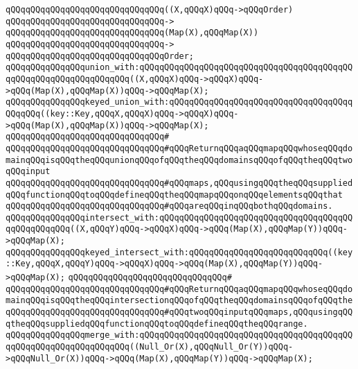 \verb|qQQqqQQqqQQqqQQqqQQqqQQqqQQqqQQq((X,qQQqX)qQQq->qQQqOrder)|\newline
\verb|qQQqqQQqqQQqqQQqqQQqqQQqqQQqqQQq->|\newline
\verb|qQQqqQQqqQQqqQQqqQQqqQQqqQQqqQQq(Map(X),qQQqMap(X))|\newline
\verb|qQQqqQQqqQQqqQQqqQQqqQQqqQQqqQQq->|\newline
\verb|qQQqqQQqqQQqqQQqqQQqqQQqqQQqqQQqOrder;|\newline
\newline
\verb|qQQqqQQqqQQqqQQqunion_with:qQQqqQQqqQQqqQQqqQQqqQQqqQQqqQQqqQQqqQQqqQQqqQQqqQQqqQQqqQQqqQQqqQQq((X,qQQqX)qQQq->qQQqX)qQQq->qQQq(Map(X),qQQqMap(X))qQQq->qQQqMap(X);|\newline
\verb|qQQqqQQqqQQqqQQqkeyed_union_with:qQQqqQQqqQQqqQQqqQQqqQQqqQQqqQQqqQQqqQQqqQQq((key::Key,qQQqX,qQQqX)qQQq->qQQqX)qQQq->qQQq(Map(X),qQQqMap(X))qQQq->qQQqMap(X);|\newline
\verb|qQQqqQQqqQQqqQQqqQQqqQQqqQQqqQQq#|\newline
\verb|qQQqqQQqqQQqqQQqqQQqqQQqqQQqqQQq#qQQqReturnqQQqaqQQqmapqQQqwhoseqQQqdomainqQQqisqQQqtheqQQqunionqQQqofqQQqtheqQQqdomainsqQQqofqQQqtheqQQqtwoqQQqinput|\newline
\verb|qQQqqQQqqQQqqQQqqQQqqQQqqQQqqQQq#qQQqmaps,qQQqusingqQQqtheqQQqsuppliedqQQqfunctionqQQqtoqQQqdefineqQQqtheqQQqmapqQQqonqQQqelementsqQQqthat|\newline
\verb|qQQqqQQqqQQqqQQqqQQqqQQqqQQqqQQq#qQQqareqQQqinqQQqbothqQQqdomains.|\newline
\newline
\verb|qQQqqQQqqQQqqQQqintersect_with:qQQqqQQqqQQqqQQqqQQqqQQqqQQqqQQqqQQqqQQqqQQqqQQqqQQq((X,qQQqY)qQQq->qQQqX)qQQq->qQQq(Map(X),qQQqMap(Y))qQQq->qQQqMap(X);|\newline
\verb|qQQqqQQqqQQqqQQqkeyed_intersect_with:qQQqqQQqqQQqqQQqqQQqqQQqqQQq((key::Key,qQQqX,qQQqY)qQQq->qQQqX)qQQq->qQQq(Map(X),qQQqMap(Y))qQQq->qQQqMap(X);|\newline
\verb|qQQqqQQqqQQqqQQqqQQqqQQqqQQqqQQq#|\newline
\verb|qQQqqQQqqQQqqQQqqQQqqQQqqQQqqQQq#qQQqReturnqQQqaqQQqmapqQQqwhoseqQQqdomainqQQqisqQQqtheqQQqintersectionqQQqofqQQqtheqQQqdomainsqQQqofqQQqthe|\newline
\verb|qQQqqQQqqQQqqQQqqQQqqQQqqQQqqQQq#qQQqtwoqQQqinputqQQqmaps,qQQqusingqQQqtheqQQqsuppliedqQQqfunctionqQQqtoqQQqdefineqQQqtheqQQqrange.|\newline
\newline
\verb|qQQqqQQqqQQqqQQqmerge_with:qQQqqQQqqQQqqQQqqQQqqQQqqQQqqQQqqQQqqQQqqQQqqQQqqQQqqQQqqQQqqQQqqQQq((Null_Or(X),qQQqNull_Or(Y))qQQq->qQQqNull_Or(X))qQQq->qQQq(Map(X),qQQqMap(Y))qQQq->qQQqMap(X);|\newline
